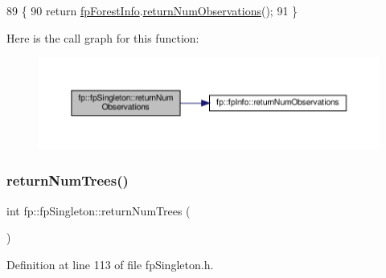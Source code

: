 \begin{DoxyCode}
89                                               \{
90                 \textcolor{keywordflow}{return} \hyperlink{classfp_1_1fpSingleton_a85965009befa72a749ae498fa5b6ccfa}{fpForestInfo}.\hyperlink{classfp_1_1fpInfo_a5d70dfbd1f8dc26dbd8f066e210cf165}{returnNumObservations}();
91             \}
\end{DoxyCode}
Here is the call graph for this function\+:\nopagebreak
\begin{figure}[H]
\begin{center}
\leavevmode
\includegraphics[width=350pt]{classfp_1_1fpSingleton_ae12f22ad096ff0d419fce47df710bf78_cgraph}
\end{center}
\end{figure}
\mbox{\label{classfp_1_1fpSingleton_a8be36616345b6b77ce4c60b99cc2b91c}} 
\subsubsection{\texorpdfstring{return\+Num\+Trees()}{returnNumTrees()}}
{\footnotesize\ttfamily int fp\+::fp\+Singleton\+::return\+Num\+Trees (\begin{DoxyParamCaption}{ }\end{DoxyParamCaption})\hspace{0.3cm}{\ttfamily [inline]}}



Definition at line 113 of file fp\+Singleton.\+h.


